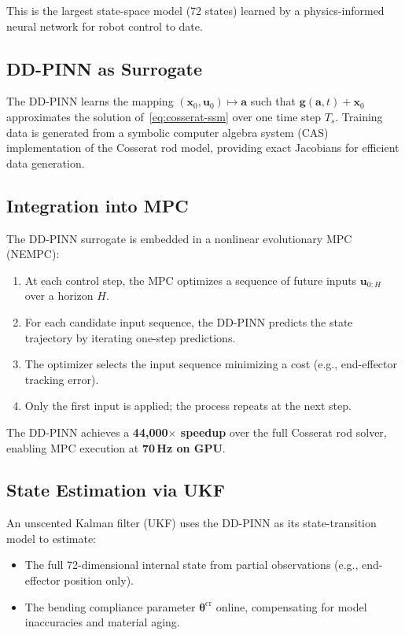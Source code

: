 \documentclass[11pt]{article}
\newcommand{\avec}{\bm{a}}
\newcommand{\uvec}{\bm{u}}
\newcommand{\xvec}{\bm{x}}
\begin{document}
This is the largest state-space model (72 states) learned by a physics-informed neural network for robot control to date.

\subsection{DD-PINN as Surrogate}

The DD-PINN learns the mapping $(\xvec_0, \uvec_0) \mapsto \avec$ such that $\bm{g}(\avec, t) + \xvec_0$ approximates the solution of~\eqref{eq:cosserat-ssm} over one time step $T_s$. Training data is generated from a symbolic computer algebra system (CAS) implementation of the Cosserat rod model, providing exact Jacobians for efficient data generation.

\subsection{Integration into MPC}

The DD-PINN surrogate is embedded in a nonlinear evolutionary MPC (NEMPC):

\begin{enumerate}
    \item At each control step, the MPC optimizes a sequence of future inputs $\uvec_{0:H}$ over a horizon $H$.
    \item For each candidate input sequence, the DD-PINN predicts the state trajectory by iterating one-step predictions.
    \item The optimizer selects the input sequence minimizing a cost (e.g., end-effector tracking error).
    \item Only the first input is applied; the process repeats at the next step.
\end{enumerate}

The DD-PINN achieves a \textbf{44,000$\bm{\times}$ speedup} over the full Cosserat rod solver, enabling MPC execution at \textbf{70\,Hz on GPU}.

\subsection{State Estimation via UKF}

An unscented Kalman filter (UKF) uses the DD-PINN as its state-transition model to estimate:
\begin{itemize}
    \item The full 72-dimensional internal state from partial observations (e.g., end-effector position only).
    \item The bending compliance parameter $\bm{\theta}^{\mathrm{cr}}$ online, compensating for model inaccuracies and material aging.
\end{itemize}
\end{document}
